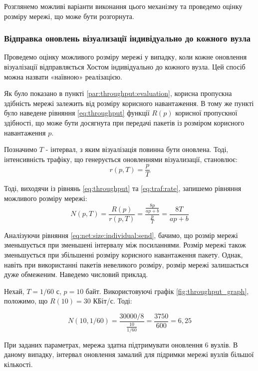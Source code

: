 \documentclass[a4paper,ukrainian,utf8,nocolumnsxix,floatsection,equationsection]{eskdtext}
\renewcommand\paragraph{\subsubsection}
\begin{document}
Розглянемо можливі варіанти виконання цього механізму та проведемо оцінку розміру мережі, що може бути розгорнута.

\paragraph{Відправка оновлень візуализації індивідуально до кожного вузла}
\label{par:individual:send}
Проведемо оцінку можливого розміру мережі у випадку, коли кожне оновлення візуалізації відправляється Хостом індивідуально до кожного вузла. Цей спосіб можна назвати «наївною» реалізацією.

Як було показано в пункті \ref{par:throughput:evaluation}, корисна пропускна здібність мережі залежить від розміру корисного навантаження. В тому же пункті було наведене рівняння \ref{eq:throughput} функції $R(p)$ корисної пропускної здібності, що може бути досягнута при передачі пакетів із розміром корисного навантаження $p$. 

Позначимо $T$ - інтервал, з яким візуалізація повинна бути оновлена. Тоді, інтенсивність трафіку, що генерується оновленнями візуализації, становлює:
\begin{equation}\label{eq:traf:rate}
	r(p, T) = \frac{p}{T}
\end{equation}

Тоді, виходячи із рівнянь \ref{eq:throughput} та \ref{eq:traf:rate}, запишемо рівняння можливого розміру мережі:
\begin{equation}\label{eq:net:size:individual:send}
	N(p, T) = \frac{R(p)}{r(p, T)} = \frac{\frac{8p}{ap+b}}{\frac{p}{T}} = \frac{8T}{ap + b}
\end{equation}

Аналізуючи рівняння \ref{eq:net:size:individual:send}, бачимо, що розмір мережі зменьшується при зменьшені інтервалу між посиланнями. Розмір мережі також зменьшується при збільшенні розміру корисного навантаження пакету. Однак, навіть при використанні пакетів невеликого розміру, розмір мережі залишається дуже обмеженим. Наведемо числовий приклад.

Нехай, $T=1/60$ с, $p = 10$ байт. Використовуючі графік \ref{fig:throughput_graph}, положимо, що $R(10) = 30$ КБіт/с. Тоді:

\begin{equation}
	N(10, 1/60) = \frac{30000 / 8}{\frac{10}{1/60}} = \frac{3750}{600} = 6,25
\end{equation}

При заданих параметрах, мережа здатна підтримувати оновлення 6 вузлів. В даному випадку, інтервал оновлення замалий для підримки мережі вузлів більшої кількості.
\end{document}
